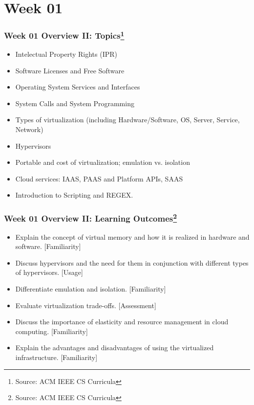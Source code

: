 
\section{Week 01}
\begin{frame}[fragile]
\frametitle{Week 01 Overview II:
Topics\footnote{Source: ACM IEEE CS Curricula}}

\begin{itemize}
\item Intelectual Property Rights (IPR)
\item Software Licenses and Free Software
\item Operating System Services and Interfaces
\item System Calls and System Programming
\item Types of virtualization (including Hardware/Software, OS, Server, Service, Network) 
\item Hypervisors 
\item Portable and cost of virtualization; emulation vs. isolation 
\item Cloud services: IAAS, PAAS and Platform APIs, SAAS
\item Introduction to Scripting and REGEX.
\end{itemize}
\end{frame}

\begin{frame}[fragile]
\frametitle{Week 01 Overview II:
Learning Outcomes\footnote{Source: ACM IEEE CS Curricula}}

\begin{itemize}
\item Explain the concept of virtual memory and how it is realized in hardware and software. [Familiarity] 
\item Discuss hypervisors and the need for them in conjunction with different types of hypervisors. [Usage] 
\item Differentiate emulation and isolation. [Familiarity]
\item Evaluate virtualization trade-offs. [Assessment]
\item Discuss the importance of elasticity and resource management in cloud computing. [Familiarity]
\item Explain the advantages and disadvantages of using the virtualized infrastructure. [Familiarity]
\end{itemize}
\end{frame}

